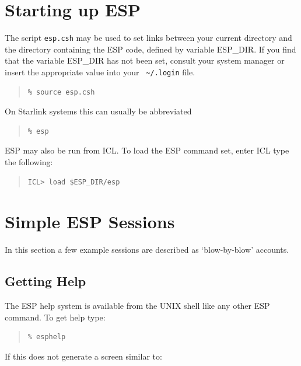 \documentclass[twoside,11pt]{article}
\newenvironment{myquote}{\begin{quote}\begin{small}}{\end{small}\end{quote}}
\begin{document}
\section{Starting up ESP}
\label{sec:starting}

The script {\tt esp.csh} may be used to set links between your current
directory and the directory containing the ESP code, defined by
variable ESP\_DIR.  If you find that the variable ESP\_DIR has not been
set, consult your system manager or insert the appropriate value into
your {\verb+ ~/.login+} file.

\begin{myquote}
\begin{verbatim}
% source esp.csh
\end{verbatim}
\end{myquote}
On Starlink systems this can usually be abbreviated
\begin{myquote}
\begin{verbatim}
% esp
\end{verbatim}
\end{myquote}

ESP may also be run from ICL. To load the ESP command set, enter ICL type
the following:

\begin{myquote}
\begin{verbatim}
ICL> load $ESP_DIR/esp
\end{verbatim}
\end{myquote}
 
\section{Simple ESP Sessions}
\label{sec:session}

In this section a few example sessions are described as `blow-by-blow' 
accounts. 


\subsection{Getting Help}

The ESP help system is available from the UNIX shell like any other ESP
command. To get help type:
 
\begin{myquote}
\begin{verbatim}
% esphelp
\end{verbatim}
\end{myquote}

If this does not generate a screen similar to:
\end{document}
